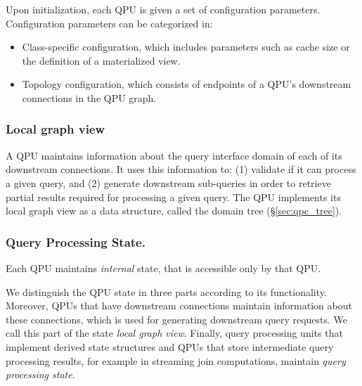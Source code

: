 Upon initialization, each QPU is given a set of configuration parameters.
Configuration parameters can be categorized in:
\begin{itemize}
  \item Class-specific configuration, which includes parameters such as cache size or the definition of a materialized view.

  \item Topology configuration, which consists of endpoints of a QPU's downstream connections in the QPU graph.
\end{itemize}

\subsubsection{Local graph view}
A QPU maintains information about the query interface domain of each of its downstream connections.
It uses this information to:
(1) validate if it can process a given query, and
(2) generate downstream sub-queries in order to retrieve partial results required for processing a given query.
The QPU implements its local graph view as a data structure, called the domain tree (\S\ref{sec:qpc_tree}).

\subsubsection{Query Processing State.}
Each QPU maintains \textit{internal} state, that is accessible only by that QPU.

We distinguish the QPU state in three parts according to its functionality.
Moreover, QPUs that have downstream connections maintain information about these connections, which is
used for generating downstream query requests.
We call this part of the state \textit{local graph view}.
Finally, query processing units that implement derived state structures and QPUs that store intermediate query processing
results, for example in streaming join computations, maintain \textit{query processing state}.

